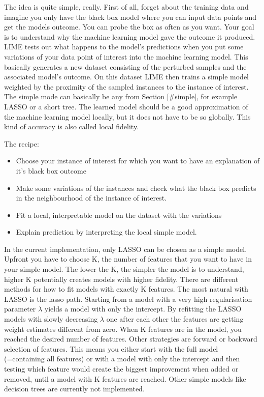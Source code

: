 \documentclass[12pt,]{krantz}
\providecommand{\tightlist}{%
  \setlength{\itemsep}{0pt}\setlength{\parskip}{0pt}}
\theoremstyle{definition}
\theoremstyle{definition}
\theoremstyle{definition}
\theoremstyle{remark}
\begin{document}
The idea is quite simple, really. First of all, forget about the
training data and imagine you only have the black box model where you
can input data points and get the models outcome. You can probe the box
as often as you want. Your goal is to understand why the machine
learning model gave the outcome it produced. LIME tests out what happens
to the model's predictions when you put some variations of your data
point of interest into the machine learning model. This basically
generates a new dataset consisting of the perturbed samples and the
associated model's outcome. On this dataset LIME then trains a simple
model weighted by the proximity of the sampled instances to the instance
of interest. The simple mode can basically be any from Section
{[}\#simple{]}, for example LASSO or a short tree. The learned model
should be a good approximation of the machine learning model locally,
but it does not have to be so globally. This kind of accuracy is also
called local fidelity.

The recipe:

\begin{itemize}
\tightlist
\item
  Choose your instance of interest for which you want to have an
  explanation of it's black box outcome
\item
  Make some variations of the instances and check what the black box
  predicts in the neighbourhood of the instance of interest.
\item
  Fit a local, interpretable model on the dataset with the variations
\item
  Explain prediction by interpreting the local simple model.
\end{itemize}

In the current implementation, only LASSO can be chosen as a simple
model. Upfront you have to choose K, the number of features that you
want to have in your simple model. The lower the K, the simpler the
model is to understand, higher K potentially creates models with higher
fidelity. There are different methods for how to fit models with exactly
K features. The most natural with LASSO is the lasso path. Starting from
a model with a very high regularisation parameter \(\lambda\) yields a
model with only the intercept. By refitting the LASSO models with slowly
decreasing \(\lambda\) one after each other the features are getting
weight estimates different from zero. When K features are in the model,
you reached the desired number of features. Other strategies are forward
or backward selection of features. This means you either start with the
full model (=containing all features) or with a model with only the
intercept and then testing which feature would create the biggest
improvement when added or removed, until a model with K features are
reached. Other simple models like decision trees are currently not
implemented.
\end{document}
